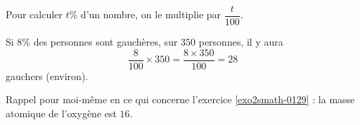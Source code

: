 \begin{Aretenir}
    Pour calculer \( t\%\) d'un nombre, on le multiplie par \( \dfrac{ t }{ 100 }\).
\end{Aretenir}

\begin{example}
    Si \( 8\%\) des personnes sont gauchères, sur \( 350\) personnes, il y aura
    \begin{equation}
        \frac{ 8 }{ 100 }\times 350=\frac{ 8\times 350 }{ 100 }=28
    \end{equation}
    gauchers (environ).
\end{example}


{\small Rappel pour moi-même en ce qui concerne l'exercice \ref{exo2smath-0129} : la masse atomique de l'oxygène est \( 16\).}


